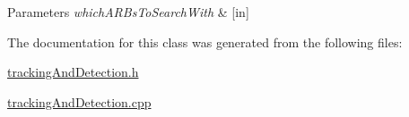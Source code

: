 \begin{DoxyParams}{Parameters}
{\em which\+A\+R\+Bs\+To\+Search\+With} & \mbox{[}in\mbox{]} \\
\hline
\end{DoxyParams}


The documentation for this class was generated from the following files\+:\begin{DoxyCompactItemize}
\item 
\hyperlink{tracking_and_detection_8h}{tracking\+And\+Detection.\+h}\item 
\hyperlink{tracking_and_detection_8cpp}{tracking\+And\+Detection.\+cpp}\end{DoxyCompactItemize}
